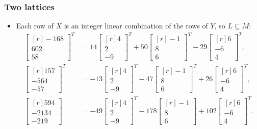 \documentclass{beamer}
\begin{document}
\begin{frame}
	\frametitle{Two lattices}
	\begin{itemize}
		\item Each row of $X$ is an integer linear combination of the rows of $Y$, so $L\subseteq M$:\pause
		\begin{align*}
		\begin{bmatrix*}[r]
			-168\\602\\58
		\end{bmatrix*}^T &= 14 \begin{bmatrix*}[r]
			4\\2\\-9
		\end{bmatrix*}^T + 50 \begin{bmatrix*}[r]
			-1\\8\\6
		\end{bmatrix*}^T -29 \begin{bmatrix*}[r]
			6\\ -6\\ 4
		\end{bmatrix*}^T,\\	
		\begin{bmatrix*}[r]
			157\\ -564\\ -57
		\end{bmatrix*}^T &= -13 \begin{bmatrix*}[r]
			4\\2\\-9
		\end{bmatrix*}^T - 47 \begin{bmatrix*}[r]
			-1\\8\\6
		\end{bmatrix*}^T + 26 \begin{bmatrix*}[r]
			6\\-6\\4
		\end{bmatrix*}^T,\\
		\begin{bmatrix*}[r]
			594\\-2134\\-219
		\end{bmatrix*}&= -49 \begin{bmatrix*}[r]
			4\\2\\-9
		\end{bmatrix*}^T - 178 \begin{bmatrix*}[r]
			-1\\8\\6
		\end{bmatrix*} + 102 \begin{bmatrix*}[r]
			6\\-6\\4
		\end{bmatrix*}^T.
		\end{align*}
	\end{itemize}
\end{frame}
\end{document}
